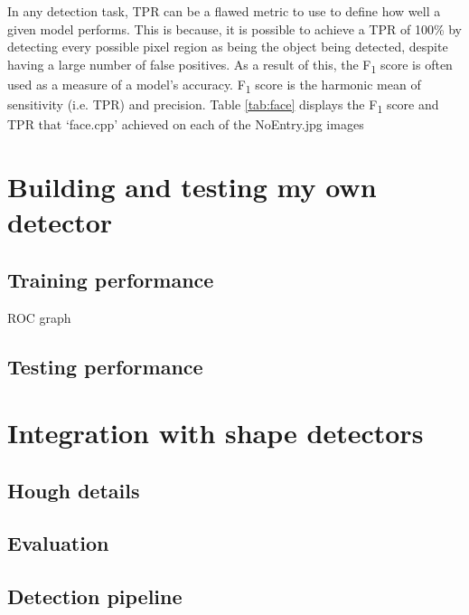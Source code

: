 \documentclass[onecolumn, 11pt, a4paper]{article}
\begin{document}
In any detection task, TPR can be a flawed metric to use to define how well a given model performs.
This is because, it is possible to achieve a TPR of 100\% by detecting every possible pixel region as being the object being detected, despite having a large number of false positives.
As a result of this, the F\textsubscript{1} score is often used as a measure of a model's accuracy.
F\textsubscript{1} score is the harmonic mean of sensitivity (i.e. TPR) and precision.
Table \ref{tab:face} displays the F\textsubscript{1} score and TPR that `face.cpp' achieved on each of the NoEntry\textasteriskcentered.jpg images

\clearpage

\section{Building and testing my own detector}

\subsection{Training performance}

ROC graph

\subsection{Testing performance}

\clearpage

\section{Integration with shape detectors}

\subsection{Hough details}

\subsection{Evaluation}

\subsection{Detection pipeline}
\end{document}
